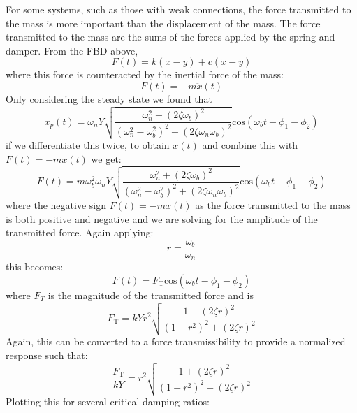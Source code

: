 \documentclass[12pt,letter]{article}
\numberwithin{ex}{section} %
\numberwithin{re}{section} %
\numberwithin{vcs}{section} %
\begin{document}
				For some systems, such as those with weak connections, the force transmitted to the mass is more important than the displacement of the mass. The force transmitted to the mass are the sums of the forces applied by the spring and damper. From the FBD above,
				\begin{equation}
				F(t) = k(x-y) + c(\dot{x} - \dot{y}) 
				\end{equation}
				where this force is counteracted by the inertial force of the mass:
				\begin{equation}
				F(t) = -m\ddot{x}(t)
				\end{equation}
				Only considering the steady state we found that 
				\begin{equation}
					x_p(t) = 	\omega_n Y   \sqrt{\frac{\omega_n^2 + (2 \zeta \omega_b)^2 }{(\omega_n^2 - \omega_b^2)^2 +  (2\zeta \omega_n \omega_b)^2} }  \text{cos}(\omega_bt - \phi_1 - \phi_2)
				\end{equation} 
				if we differentiate this twice, to obtain $\ddot{x}(t)$ and combine this with $F(t) = -m\ddot{x}(t)$ we get:
				\begin{equation}
					F(t) = 	m \omega_b^2 \omega_n Y   \sqrt{\frac{\omega_n^2 + (2 \zeta \omega_b)^2 }{(\omega_n^2 - \omega_b^2)^2 +  (2\zeta \omega_n \omega_b)^2} }  \text{cos}(\omega_bt - \phi_1 - \phi_2)
				\end{equation} 
				where the negative sign $F(t) = -m\ddot{x}(t)$ as the force transmitted to the mass is both positive and negative and we are solving for the amplitude of the transmitted force. Again applying:
				\begin{equation}
					r=\frac{\omega_b}{\omega_n}
				\end{equation} 
				this becomes:
				\begin{equation}
					F(t) = 	F_\text{T} \text{cos}(\omega_bt - \phi_1 - \phi_2)
				\end{equation} 
				where $F_T$ is the magnitude of the transmitted force and is 
				\begin{equation}
					F_\text{T} = kYr^2 \sqrt{\frac{1+(2 \zeta r)^2}{(1-r^2)^2 + (2 \zeta r )^2}} 
				\end{equation}
				Again, this can be converted to a force transmissibility to provide a normalized response such that:
				\begin{equation}
					\frac{F_\text{T}}{kY} = r^2 \sqrt{\frac{1+(2 \zeta r)^2}{(1-r^2)^2 + (2 \zeta r )^2}} 
				\end{equation}
				Plotting this for several critical damping ratios:
\end{document}
